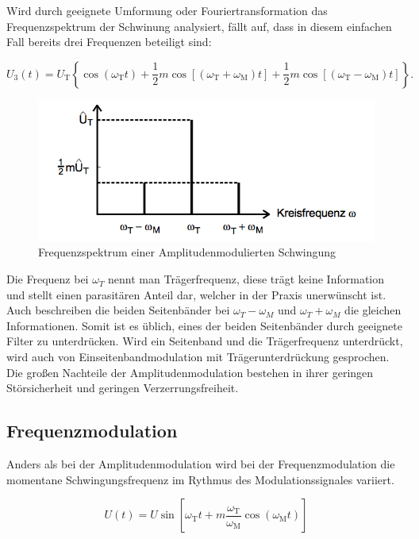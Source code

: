 Wird durch geeignete Umformung oder Fouriertransformation das Frequenzspektrum der Schwinung analysiert, fällt auf, dass in diesem einfachen Fall bereits drei Frequenzen beteiligt sind:

\begin{equation}
U_{3}(t) = U_\text{T} \left\{ \cos( \omega_\text{T} t) +
\frac{1}{2} m \cos\left[(\omega_\text{T} + \omega_\text{M}) t \right] +
\frac{1}{2} m \cos\left[(\omega_\text{T} - \omega_\text{M}) t \right] \right\}.
\label{eq:FreqAmMod}
\end{equation}

\begin{figure}
	\centering
	\includegraphics[width=\textwidth]{img/Abb2.png}
	\caption{Frequenzspektrum einer Amplitudenmodulierten Schwingung \cite{FP}}
\end{figure}

\noindent Die Frequenz bei $\omega_T$ nennt man Trägerfrequenz, diese trägt keine Information und stellt einen parasitären Anteil dar, welcher in der Praxis unerwünscht ist. Auch beschreiben die beiden Seitenbänder bei $\omega_T - \omega_M$ und $\omega_T + \omega_M$ die gleichen Informationen. Somit ist es üblich, eines der beiden Seitenbänder durch geeignete Filter zu unterdrücken.
Wird ein Seitenband und die Trägerfrequenz unterdrückt, wird auch von Einseitenbandmodulation mit Trägerunterdrückung gesprochen.
Die großen Nachteile der Amplitudenmodulation bestehen in ihrer geringen Störsicherheit und geringen Verzerrungsfreiheit.

\FloatBarrier

\subsection{Frequenzmodulation}
Anders als bei der Amplitudenmodulation wird bei der Frequenzmodulation die momentane Schwingungsfrequenz im Rythmus des Modulationssignales variiert.

\begin{equation}
U(t)= U \sin \left[\omega_\text{T} t + m \frac{\omega_\text{T}}{\omega_\text{M}} \cos(\omega_\text{M} t)\right]
\label{eq:FreqMod}
\end{equation}

